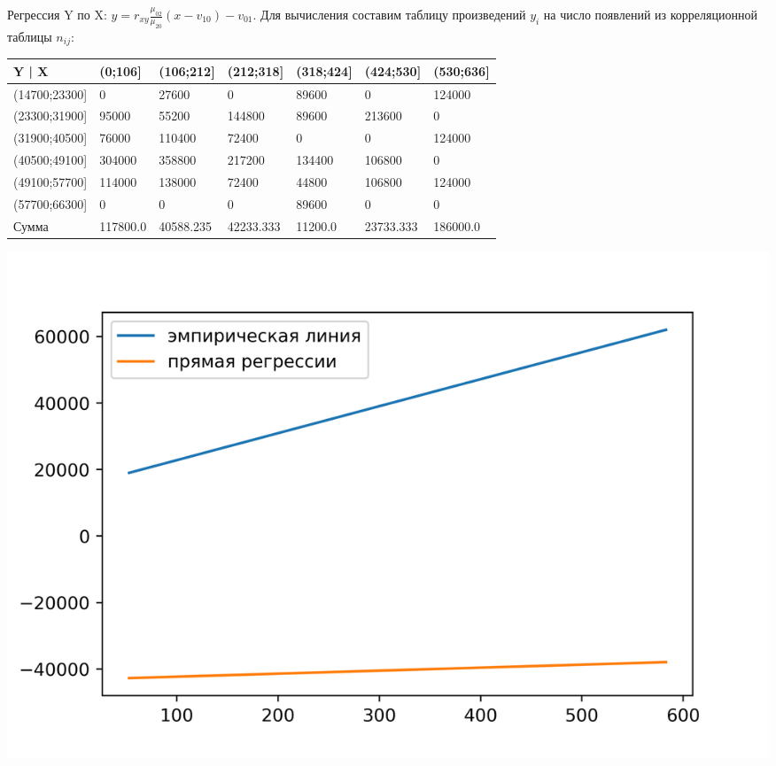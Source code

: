 \documentclass[titlepage]{article}
\begin{document}
Регрессия Y по X: $y = r_{xy} \frac{\mu_{02} }{\mu_{20} } (x - v_{10}) - v_{01}$.
Для вычисления составим таблицу произведений $y_i$ на число появлений из корреляционной таблицы $n_{ij}$:
\begin{table}[!ht]
    \centering
    \begin{tabular}{|l|l|l|l|l|l|l|}
    \hline
        Y | X               & (0;106] & (106;212] & (212;318] & (318;424] & (424;530] & (530;636] \\ \hline
        (14700;23300] &      0 &  27600 &      0 &  89600 &      0 & 124000 \\ \hline
        (23300;31900] &  95000 &  55200 & 144800 &  89600 & 213600 &      0 \\ \hline
        (31900;40500] &  76000 & 110400 &  72400 &      0 &      0 & 124000 \\ \hline
        (40500;49100] & 304000 & 358800 & 217200 & 134400 & 106800 &      0 \\ \hline
        (49100;57700] & 114000 & 138000 &  72400 &  44800 & 106800 & 124000 \\ \hline
        (57700;66300] &      0 &      0 &      0 &  89600 &      0 &      0 \\ \hline
		Сумма & 117800.0 & 40588.235 & 42233.333 & 11200.0 & 23733.333 & 186000.0 \\ \hline
    \end{tabular}
\end{table}

\includegraphics[scale=0.6]{fig03}

\clearpage
\appendix
\end{document}
